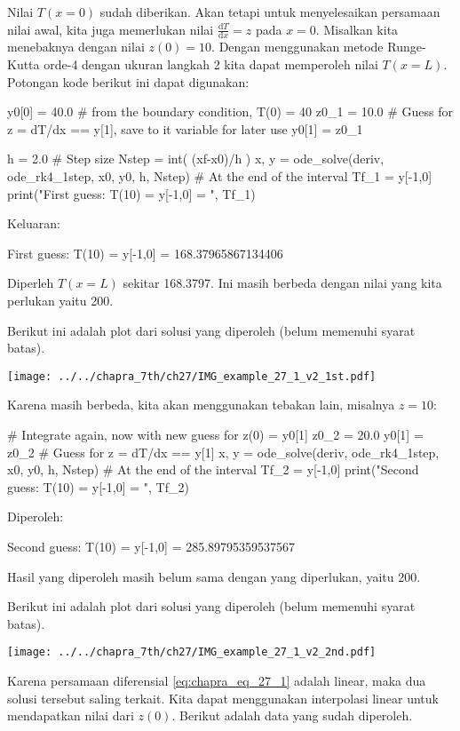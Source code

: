 Nilai $T(x=0)$ sudah diberikan. Akan tetapi untuk menyelesaikan persamaan nilai
awal, kita juga memerlukan nilai $\frac{\mathrm{d}T}{\mathrm{d}x} = z$ pada $x=0$.
Misalkan kita menebaknya dengan nilai $z(0) = 10$.
Dengan menggunakan metode Runge-Kutta orde-4 dengan ukuran langkah 2 kita dapat memperoleh
nilai $T(x=L)$. Potongan kode berikut ini dapat digunakan:
\begin{pythoncode}
y0[0] = 40.0 # from the boundary condition, T(0) = 40
z0_1 = 10.0 # Guess for z = dT/dx == y[1], save to it variable for later use
y0[1] = z0_1

h = 2.0 # Step size
Nstep = int( (xf-x0)/h )
x, y = ode_solve(deriv, ode_rk4_1step, x0, y0, h, Nstep)
# At the end of the interval
Tf_1 = y[-1,0]
print("First guess: T(10) = y[-1,0] = ", Tf_1)
\end{pythoncode}
Keluaran:
\begin{textcode}
First guess: T(10) = y[-1,0] =  168.37965867134406
\end{textcode}
Diperleh $T(x=L)$ sekitar 168.3797. Ini masih berbeda dengan nilai yang kita perlukan
yaitu 200.

Berikut ini adalah plot dari solusi yang diperoleh (belum memenuhi syarat batas).

{\centering
\texttt{[image: ../../chapra\_7th/ch27/IMG\_example\_27\_1\_v2\_1st.pdf]}
\par}

Karena masih berbeda, kita akan menggunakan tebakan lain, misalnya $z=10$:
\begin{pythoncode}
# Integrate again, now with new guess for z(0) = y0[1]
z0_2 = 20.0
y0[1] = z0_2 # Guess for z = dT/dx == y[1]
x, y = ode_solve(deriv, ode_rk4_1step, x0, y0, h, Nstep)
# At the end of the interval
Tf_2 = y[-1,0]
print("Second guess: T(10) = y[-1,0] = ", Tf_2)
\end{pythoncode}
Diperoleh:
\begin{textcode}
Second guess: T(10) = y[-1,0] =  285.89795359537567
\end{textcode}
Hasil yang diperoleh masih belum sama dengan yang diperlukan, yaitu 200.

Berikut ini adalah plot dari solusi yang diperoleh (belum memenuhi syarat batas).

{\centering
\texttt{[image: ../../chapra\_7th/ch27/IMG\_example\_27\_1\_v2\_2nd.pdf]}
\par}

Karena persamaan diferensial \eqref{eq:chapra_eq_27_1} adalah linear, maka
dua solusi tersebut saling terkait.
Kita dapat menggunakan interpolasi linear untuk mendapatkan nilai dari $z(0)$.
Berikut adalah data yang sudah diperoleh.

